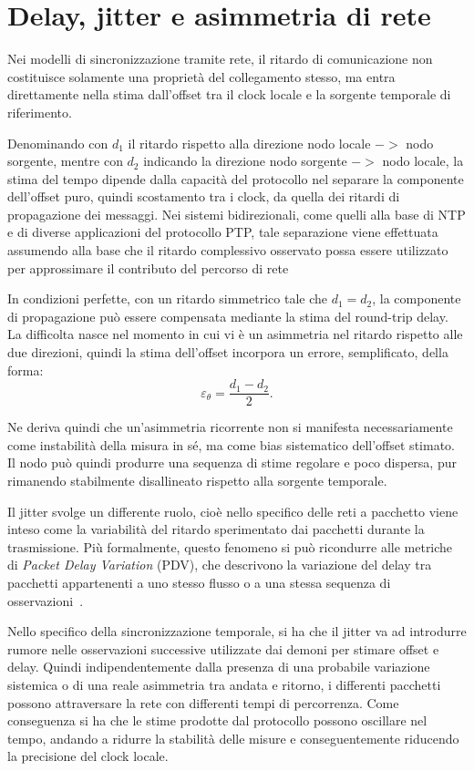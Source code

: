 \section{Delay, jitter e asimmetria di rete}
Nei modelli di sincronizzazione tramite rete, il ritardo di comunicazione non
costituisce solamente una proprietà del collegamento stesso, ma entra direttamente
nella stima dall'offset tra il clock locale e la sorgente temporale di
riferimento.

Denominando con $d_{1}$ il ritardo rispetto alla direzione nodo locale ${->}$ nodo
sorgente, mentre con $d_{2}$ indicando la direzione nodo sorgente ${->}$ nodo
locale, la stima del tempo dipende dalla capacità del protocollo nel separare la componente
dell'offset puro, quindi scostamento tra i clock, da quella dei ritardi di propagazione
dei messaggi. Nei sistemi bidirezionali, come quelli alla base di NTP e di diverse
applicazioni del protocollo PTP, tale separazione viene effettuata assumendo
alla base che il ritardo complessivo osservato possa essere utilizzato per
approssimare il contributo del percorso di rete
\cite{martinNetworkTimeProtocol2010, IEEEStandardPrecision2020}

In condizioni perfette, con un ritardo simmetrico tale che $d_{1}= d_{2}$, la componente
di propagazione può essere compensata mediante la stima del round-trip delay. La
difficolta nasce nel momento in cui vi è un asimmetria nel ritardo rispetto alle
due direzioni, quindi la stima dell'offset incorpora un errore, semplificato, della
forma:
\[
  \varepsilon_{\theta}= \frac{d_{1}- d_{2}}{2}.
\]

Ne deriva quindi che un'asimmetria ricorrente non si manifesta necessariamente come
instabilità della misura in sé, ma come bias sistematico dell'offset stimato. Il nodo
può quindi produrre una sequenza di stime regolare e poco dispersa, pur
rimanendo stabilmente disallineato rispetto alla sorgente temporale.

Il jitter svolge un differente ruolo, cioè nello specifico delle reti a pacchetto 
viene inteso come la variabilità del ritardo sperimentato dai pacchetti durante la trasmissione.
Più formalmente, questo fenomeno si può ricondurre alle metriche
di \emph{Packet Delay Variation} (PDV), che descrivono la variazione del
delay tra pacchetti appartenenti a uno stesso flusso o a una stessa sequenza di
osservazioni~\cite{demichelisIPPacketDelayVariation2002,mortonPacketDelayVariation2009}.

Nello specifico della sincronizzazione temporale, si ha che il jitter va ad introdurre rumore nelle
osservazioni successive utilizzate dai demoni per stimare offset e delay. 
Quindi indipendentemente dalla presenza di una probabile variazione
sistemica o di una reale asimmetria
tra andata e ritorno, i differenti pacchetti possono attraversare la rete con differenti tempi
di percorrenza. 
Come conseguenza si ha che le stime prodotte dal protocollo possono oscillare nel tempo, andando a
ridurre la stabilità delle misure e conseguentemente riducendo la precisione del clock locale.

